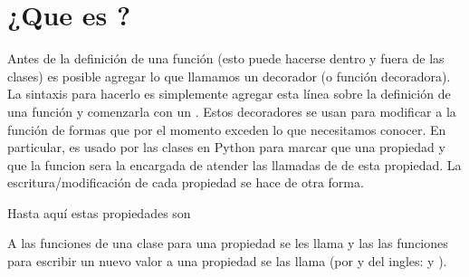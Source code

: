 \documentclass[a4paper,12pt,spanish]{sphinxmanual}
\begin{document}
\section{¿Que es ?}
\label{\detokenize{class-props:que-es-property}}
\sphinxAtStartPar
Antes de la definición de una función (esto puede hacerse dentro y fuera de las clases)
es posible agregar lo que llamamos un decorador (o función decoradora). La sintaxis para
hacerlo es simplemente agregar esta línea sobre la definición de una función y comenzarla
con un . Estos decoradores se usan para modificar a la función de
formas que por el momento exceden lo que necesitamos conocer.
En particular,  es usado por las clases en Python para marcar que una
propiedad  y que la funcion 
sera la encargada de atender las llamadas de  de esta propiedad.
La escritura/modificación de cada propiedad se hace de otra forma.

\sphinxAtStartPar
Hasta aquí estas propiedades son 

%
\begin{sphinxVerbatim}[commandchars=\\\{\},numbers=left,firstnumber=1,stepnumber=1]
   
  
\end{sphinxVerbatim}
\sphinxresetverbatimhllines

\sphinxAtStartPar
A las funciones de una clase para  una propiedad se les llama 
y las las funciones para escribir un nuevo valor a una propiedad se las llama
 (por  y  del ingles:  y ).
\end{document}
